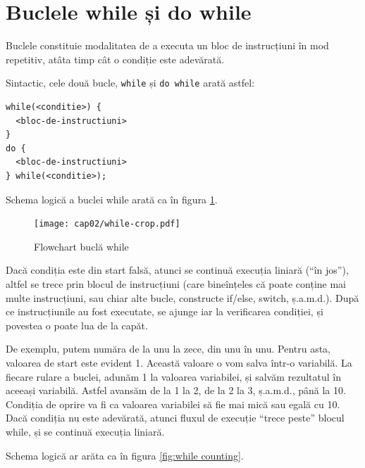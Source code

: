 \section{Buclele while și do while}
Buclele constituie modalitatea de a executa un bloc de instrucțiuni
în mod repetitiv, atâta timp cât o condiție este adevărată.

Sintactic, cele două bucle, \texttt{while} și \texttt{do while} arată astfel:
\begin{lstlisting}
while(<conditie>) {
  <bloc-de-instructiuni>
}
do {
  <bloc-de-instructiuni>
} while(<conditie>);
\end{lstlisting}

Schema logică a buclei while arată ca în figura \ref{fig:flowchart while loop}.

\begin{figure}[ht!]
  \centering
    \texttt{[image: cap02/while-crop.pdf]}
  \caption{Flowchart buclă while}
  \label{fig:flowchart while loop}
\end{figure}

Dacă condiția este din start falsă, atunci se continuă execuția liniară (``în jos''),
altfel se trece prin blocul de instrucțiuni (care bineînțeles că poate
conține mai multe instrucțiuni, sau chiar alte bucle, constructe if/else, switch, ș.a.m.d.).
După ce instrucțiunile au fost executate, se ajunge iar la verificarea condiției,
și povestea o poate lua de la capăt.


De exemplu, putem număra de la unu la zece, din unu în unu. Pentru asta,
valoarea de start este evident 1. Această valoare o vom salva într-o variabilă.
La fiecare rulare a buclei, adunăm 1 la valoarea variabilei, și salvăm
rezultatul în aceeași variabilă. Astfel avansăm de la 1 la 2, de la 2 la 3,
ș.a.m.d., până la 10. Condiția de oprire va fi ca valoarea variabilei să
fie mai mică sau egală cu 10. Dacă condiția nu este adevărată, atunci fluxul de execuție
``trece peste'' blocul while, și se continuă execuția liniară.

Schema logică ar arăta ca în figura \ref{fig:while counting}.

